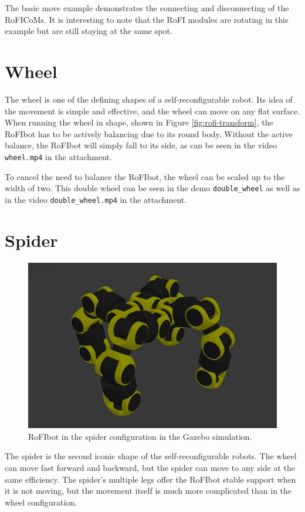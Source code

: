 \documentclass[
  printed, %
  color,   %
  notable, %
  oneside, %
  nolof,   %
  nolot,   %
  nocover,
]{fithesis3}
\newcommand{\code}[1]{\texttt{#1}}
\begin{document}
The basic move example demonstrates the connecting and disconnecting of the RoFICoMs.
It is interesting to note that the RoFI modules are rotating in this example but are still staying at the same spot.

\section{Wheel}

The wheel is one of the defining shapes of a self-reconfigurable robot.
Its idea of the movement is simple and effective, and the wheel can move on any flat surface.
When running the wheel in shape, shown in Figure \ref{fig:rofi-transform}, the RoFIbot has to be actively balancing due to its round body.
Without the active balance, the RoFIbot will simply fall to its side, as can be seen in the video \code{wheel.mp4} in the attachment.

To cancel the need to balance the RoFIbot, the wheel can be scaled up to the width of two.
This double wheel can be seen in the demo \code{double\_wheel} as well as in the video \code{double\_wheel.mp4} in the attachment.

\section{Spider}

\begin{figure}
    \centering
    \includegraphics[width=.9\linewidth]{data/spider.jpg}
    \caption{RoFIbot in the spider configuration in the Gazebo simulation.}
    \label{fig:spider}
\end{figure}

The spider is the second iconic shape of the self-reconfigurable robots.
The wheel can move fast forward and backward, but the spider can move to any side at the same efficiency.
The spider's multiple legs offer the RoFIbot stable support when it is not moving, but the movement itself is much more complicated than in the wheel configuration.
\end{document}
